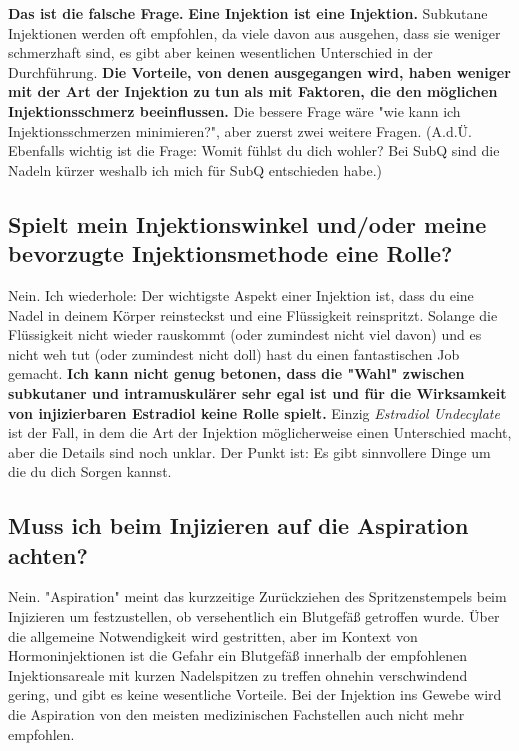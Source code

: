 \documentclass{article}
\begin{document}
\textbf{Das ist die falsche Frage.} \textbf{Eine Injektion ist eine Injektion.} Subkutane Injektionen werden oft empfohlen, da viele davon aus ausgehen, dass sie weniger schmerzhaft sind, es gibt aber keinen wesentlichen Unterschied in der Durchführung. \textbf{Die Vorteile, von denen ausgegangen wird, haben weniger mit der Art der Injektion zu tun als mit Faktoren, die den möglichen Injektionsschmerz beeinflussen.} Die bessere Frage wäre "wie kann ich Injektionsschmerzen minimieren?", aber zuerst zwei weitere Fragen. (A.d.Ü. Ebenfalls wichtig ist die Frage: Womit fühlst du dich wohler? Bei SubQ sind die Nadeln kürzer weshalb ich mich für SubQ entschieden habe.)

\subsection{Spielt mein Injektionswinkel und/oder meine bevorzugte Injektionsmethode eine Rolle?}

Nein. Ich wiederhole: Der wichtigste Aspekt einer Injektion ist, dass du eine Nadel in deinem Körper reinsteckst und eine Flüssigkeit reinspritzt. Solange die Flüssigkeit nicht wieder rauskommt (oder zumindest nicht viel davon) und es nicht weh tut (oder zumindest nicht doll) hast du einen fantastischen Job gemacht. \textbf{Ich kann nicht genug betonen, dass die "Wahl" zwischen subkutaner und intramuskulärer sehr egal ist und für die Wirksamkeit von injizierbaren Estradiol keine Rolle spielt.} Einzig \textit{Estradiol Undecylate} ist der Fall, in dem die Art der Injektion möglicherweise einen Unterschied macht, aber die Details sind noch unklar. Der Punkt ist: Es gibt sinnvollere Dinge um die du dich Sorgen kannst.

\subsection{Muss ich beim Injizieren auf die Aspiration achten?}

Nein. "Aspiration" meint das kurzzeitige Zurückziehen des Spritzenstempels beim Injizieren um festzustellen, ob versehentlich ein Blutgefäß getroffen wurde. Über die allgemeine Notwendigkeit wird gestritten, aber im Kontext von Hormoninjektionen ist die Gefahr ein Blutgefäß innerhalb der empfohlenen Injektionsareale mit kurzen Nadelspitzen zu treffen ohnehin verschwindend gering, und gibt es keine wesentliche Vorteile. Bei der Injektion ins Gewebe wird die Aspiration von den meisten medizinischen Fachstellen auch nicht mehr empfohlen.
\end{document}
